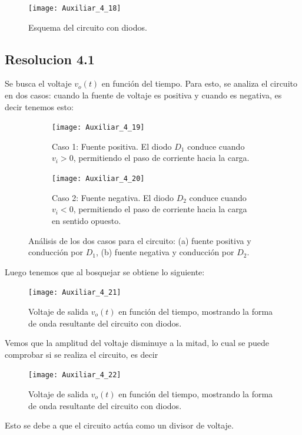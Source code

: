\documentclass[
  11pt,
  letterpaper,
   addpoints,
  ]{exam}
\begin{document}
\begin{questions}
\begin{figure}[H]
    \centering
    \texttt{[image: Auxiliar\_4\_18]}
  \caption{Esquema del circuito con diodos.}
    \label{fig:P2_17}
\end{figure}
\begin{solution}
    \subsection*{Resolucion 4.1}
    Se busca el voltaje \(v_o(t)\) en función del tiempo. Para esto, se analiza el circuito en dos casos: cuando la fuente de voltaje es positiva y cuando es negativa, es decir tenemos esto:

  \begin{figure}[H]
    \centering
    \begin{subfigure}[b]{0.48\textwidth}
      \centering
    \texttt{[image: Auxiliar\_4\_19]}
     \caption{Caso 1: Fuente positiva. El diodo $D_1$ conduce cuando $v_i > 0$, permitiendo el paso de corriente hacia la carga.}
      \label{fig:resolucion4.1a}
    \end{subfigure}\hfill
    \begin{subfigure}[b]{0.48\textwidth}
      \centering
      \texttt{[image: Auxiliar\_4\_20]}
     \caption{Caso 2: Fuente negativa. El diodo $D_2$ conduce cuando $v_i < 0$, permitiendo el paso de corriente hacia la carga en sentido opuesto.}
      \label{fig:resolucion4.1b}
    \end{subfigure}
    \caption{Análisis de los dos casos para el circuito: (a) fuente positiva y conducción por $D_1$, (b) fuente negativa y conducción por $D_2$.}
  \label{fig:resolucion4.1}
  \end{figure}
Luego tenemos que al bosquejar se obtiene lo siguiente:
\begin{figure}[H]
  \centering
  \texttt{[image: Auxiliar\_4\_21]}
  \caption{Voltaje de salida \(v_o(t)\) en función del tiempo, mostrando la forma de onda resultante del circuito con diodos.}
  \label{fig:voltaje-salida-4.1}
\end{figure}
Vemos que la amplitud del voltaje disminuye a la mitad, lo cual se puede comprobar si se realiza el circuito, es decir
\begin{figure}[H]
  \centering
  \texttt{[image: Auxiliar\_4\_22]}
  \caption{Voltaje de salida \(v_o(t)\) en función del tiempo, mostrando la forma de onda resultante del circuito con diodos.}
  \label{fig:voltaje-salida-4.1-2}
\end{figure}
Esto se debe a que el circuito actúa como un divisor de voltaje.

\end{solution}
\end{questions}
\end{document}
